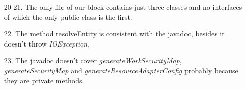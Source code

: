 \begin{itemize}
\item [20-21.] The only file of our block contains just three classes and no interfaces of which the only public class is the first.
\item [22.] The method resolveEntity is consistent with the javadoc, besides it doesn't throw \textit{IOException}.
\item [23.] The javadoc doesn't cover \textit{generateWorkSecurityMap}, \textit{generateSecurityMap} and \textit{generateResourceAdapterConfig} probably because they are private methods.
\end{itemize}